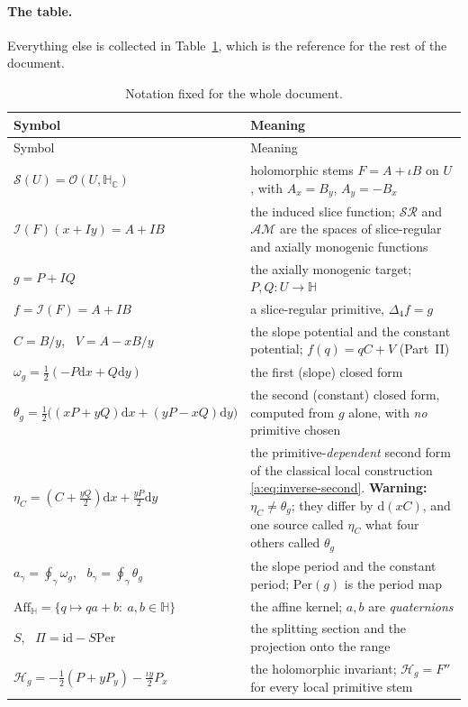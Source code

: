 \documentclass[11pt,a4paper]{article}
\numberwithin{equation}{section}
\theoremstyle{definition}
\theoremstyle{remark}
\theoremstyle{plain}
\newcommand{\HH}{\mathbb H}
\newcommand{\HC}{\mathbb H_{\mathbb C}}
\newcommand{\lap}{\Delta_4}
\newcommand{\I}{\mathcal I}
\newcommand{\SR}{\mathcal{SR}}
\newcommand{\AM}{\mathcal{AM}}
\newcommand{\Stem}{\mathcal S}
\newcommand{\Aff}{\mathrm{Aff}_{\HH}}
\newcommand{\om}{\omega}
\newcommand{\thet}{\theta}
\newcommand{\etaC}{\eta_{C}}
\newcommand{\Per}{\mathrm{Per}}
\newcommand{\pot}{C}          %
\newcommand{\potV}{V}         %
\newcommand{\Hg}{\mathcal H_{g}}      %
\newcommand{\dd}{\mathrm d}
\begin{document}
\paragraph{The table.}
Everything else is collected in Table~\ref{a:tab:notation}, which is the
reference for the rest of the document.

{\small
\renewcommand{\arraystretch}{1.25}
\begin{longtable}{@{}p{}p{}@{}}
\caption{Notation fixed for the whole document.}
\label{a:tab:notation}\\
\toprule
Symbol & Meaning\\
\midrule
\endfirsthead
\toprule
Symbol & Meaning\\
\midrule
\endhead
$\Stem(U)=\mathcal O(U,\HC)$ & holomorphic stems $F=A+\iota B$ on $U$, with
 $A_x=B_y$, $A_y=-B_x$\\
$\I(F)(x+Iy)=A+IB$ & the induced slice function; $\SR$ and $\AM$ are the
 spaces of slice-regular and axially monogenic functions\\
$g=P+IQ$ & the axially monogenic target; $P,Q:U\to\HH$\\
$f=\I(F)=A+IB$ & a slice-regular primitive, $\lap f=g$\\
$\pot=B/y$, \ $\potV=A-xB/y$ & the slope potential and the constant
 potential; $f(q)=q\pot+\potV$ (Part~II)\\
$\om_g=\tfrac12(-P\dd x+Q\dd y)$ & the first (slope) closed form\\
$\thet_g=\tfrac12\bigl((xP+yQ)\dd x+(yP-xQ)\dd y\bigr)$ & the second
 (constant) closed form, computed from $g$ alone, with \emph{no} primitive
 chosen\\
$\etaC=(\pot+\tfrac{yQ}2)\dd x+\tfrac{yP}2\dd y$ & the
 primitive-\emph{dependent} second form of the classical local construction
 \eqref{a:eq:inverse-second}. \textbf{Warning:} $\etaC\ne\thet_g$; they
 differ by $\dd(x\pot)$, and one source called $\etaC$ what four others called
 $\thet_g$\\
$a_\gamma=\oint_\gamma\om_g$, \ $b_\gamma=\oint_\gamma\thet_g$ & the slope
 period and the constant period; $\Per(g)$ is the period map\\
$\Aff=\{q\mapsto qa+b:\ a,b\in\HH\}$ & the affine kernel; $a,b$ are
 \emph{quaternions}\\
$S$, \ $\Pi=\mathrm{id}-S\Per$ & the splitting section and the projection
 onto the range\\
$\Hg=-\tfrac12(P+yP_y)-\tfrac{\iota y}{2}P_x$ & the holomorphic invariant;
 $\Hg=F''$ for every local primitive stem\\

\end{longtable}}
\end{document}
